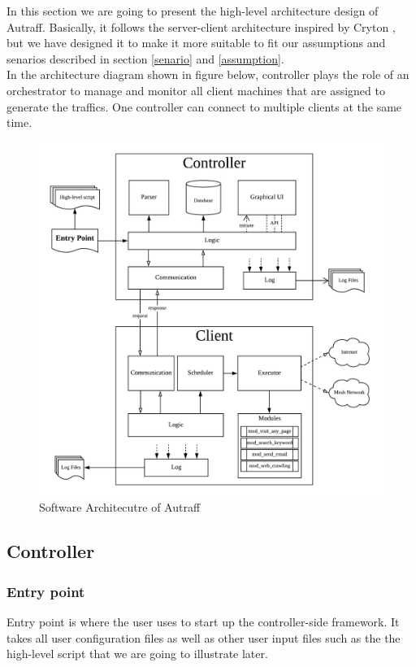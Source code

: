 \documentclass[12pt]{report}
\begin{document}
In this section we are going to present the high-level architecture design of Autraff. Basically, it follows the server-client architecture inspired by Cryton \citep{Cryton}, but we have designed it to make it more suitable to fit our assumptions and senarios described in section \ref{senario} and \ref{assumption}.\\

In the architecture diagram shown in figure below, controller plays the role of an orchestrator to manage and monitor all client machines that are assigned to generate the traffics. One controller can connect to multiple clients at the same time. 

\vfill

\begin{figure}[h!]
	\centering
	\includegraphics[width=1\textwidth]{./pictures/autraff-arc}
	\caption{Software Architecutre of Autraff}
\end{figure}


\subsection{Controller}
\subsubsection{Entry point}
Entry point is where the user uses to start up the controller-side framework. It takes all user configuration files as well as other user input files such as the the high-level script that we are going to illustrate later.
\end{document}

